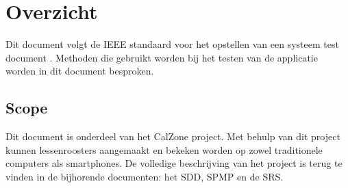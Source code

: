 \section{Overzicht}
Dit document volgt de IEEE standaard voor het opstellen van een systeem test document \cite{ieee}. 
Methoden die gebruikt worden bij het testen van de applicatie worden in dit document besproken.

\subsection{Scope}
Dit document is onderdeel van het CalZone\cite{calzone} project. 
Met behulp van dit project kunnen lessenroosters aangemaakt en bekeken worden op zowel traditionele computers als smartphones. 
De volledige beschrijving van het project is terug te vinden in de bijhorende documenten: het SDD\cite{sdd}, SPMP\cite{spmp} en de SRS\cite{srs}.